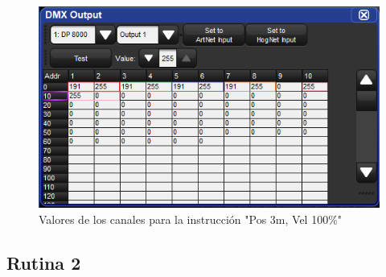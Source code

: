 \begin{figure}[!ht]
	\centering
	\includegraphics[width=16cm,scale=1]{resources/4_5-cuelist1_cue2.png}
	\caption{Valores de los canales para la instrucción "Pos 3m, Vel 100\%"}
	\label{fig:\thefigure}
\end{figure}

\subsection{Rutina 2}







